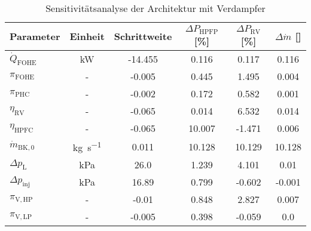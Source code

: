 \begin{table}[ht]
    \centering
	\caption{Sensitivitätsanalyse der Architektur mit Verdampfer}
	\begin{tabular} {|l|c|c|c|c|c|} \hline%
		Parameter & Einheit & Schrittweite & $ \Delta P_\mathrm{HPFP}$ [\%] & $ \Delta P_\mathrm{RV}$ [\%] & $ \Delta \dot{m}$ [\textperthousand] \\ \hline\hline%
$\dot{Q}_\mathrm{FOHE}$ & \si{\kilo\W} & -14.455 & 0.116 & 0.117 & 0.116 \\ \hline 
$\pi_\mathrm{FOHE}$ & - & -0.005 & 0.445 & 1.495 & 0.004 \\ \hline 
$\pi_\mathrm{PHC}$ & - & -0.002 & 0.172 & 0.582 & 0.001 \\ \hline 
$\eta_\mathrm{RV}$ & - & -0.065 & 0.014 & 6.532 & 0.014 \\ \hline 
$\eta_\mathrm{HPFC}$ & - & -0.065 & 10.007 & -1.471 & 0.006 \\ \hline 
$\dot{m}_\mathrm{BK,0}$ & \si{\kg\per\s} & 0.011 & 10.128 & 10.129 & 10.128 \\ \hline 
$\Delta p_\mathrm{L}$ & \si{\kilo\Pa} & 26.0 & 1.239 & 4.101 & 0.01 \\ \hline 
$\Delta p_\mathrm{inj}$ & \si{\kilo\Pa} & 16.89 & 0.799 & -0.602 & -0.001 \\ \hline 
$\pi_\mathrm{V, HP}$ & - & -0.01 & 0.848 & 2.827 & 0.007 \\ \hline 
$\pi_\mathrm{V, LP}$ & - & -0.005 & 0.398 & -0.059 & 0.0 \\ \hline 


	\end{tabular}	
    \label{Tab:sensafter}%
\end{table}
\FloatBarrier 



